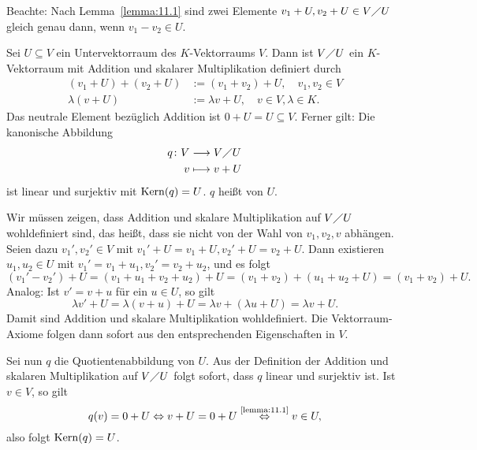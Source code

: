 Beachte: Nach Lemma~\ref{lemma:11.1} sind zwei Elemente $v_1+U, v_2 +U \in V \diagup U$ gleich genau dann, wenn $v_1 - v_2 \in U$.

\begin{satz}[Quotientenabbildung]
	\label{satz:11.3}
	Sei $U \subseteq V$ ein Untervektorraum des $K$-Vektorraums $V$.
	Dann ist $V \diagup U$ ein $K$-Vektorraum mit Addition und skalarer Multiplikation definiert durch
	\begin{align*}
		(v_1 + U) + (v_2 + U) &:= (v_1 + v_2) + U, \quad v_1,v_2 \in V \\
		\lambda (v+U) &:= \lambda v + U, \quad v \in V, \lambda \in K.
	\end{align*}
	Das neutrale Element bezüglich Addition ist $0 + U = U \subseteq V$.
	Ferner gilt:
	Die kanonische Abbildung
	\begin{align*}
		q\colon V &\longrightarrow V \diagup U \\
		v &\longmapsto v+U
	\end{align*}
	ist linear und surjektiv mit $\operatorname{Kern}(q) = U$.
	$q$ heißt  von $U$.
\end{satz}

\begin{beweis}
	Wir müssen zeigen, dass Addition und skalare Multiplikation auf $V \diagup U$ wohldefiniert sind, das heißt, dass sie nicht von der Wahl von $v_1,v_2,v$ abhängen.
	Seien dazu $v_1',v_2' \in V$ mit $v_1' + U = v_1 + U, v_2' + U = v_2 + U$.
	Dann existieren $u_1,u_2 \in U$ mit $v_1' = v_1 + u_1, v_2' = v_2+u_2$, und es folgt
	\[
		(v_1'-v_2')+U = (v_1+u_1+v_2+u_2)+U = (v_1+v_2) + (u_1+u_2+U) = (v_1+v_2) + U.
	\]
	Analog: Ist $v' = v+u$ für ein $u \in U$, so gilt
	\[
		\lambda v' + U = \lambda(v+u)+U = \lambda v + (\lambda u + U) = \lambda v + U.
	\]
	Damit sind Addition und skalare Multiplikation wohldefiniert.
	Die Vektorraum-Axiome folgen dann sofort aus den entsprechenden Eigenschaften in $V$.
	
	Sei nun $q$ die Quotientenabbildung von $U$.
	Aus der Definition der Addition und skalaren Multiplikation auf $V \diagup U$ folgt sofort, dass $q$ linear und surjektiv ist.
	Ist $v \in V$, so gilt
	\[
		q(v) = 0 + U \Leftrightarrow v+ U = 0+U \stackrel{\text{\ref{lemma:11.1}}}{\Leftrightarrow} v \in U,
	\]
	also folgt $\operatorname{Kern}(q) = U$. 
\end{beweis}

